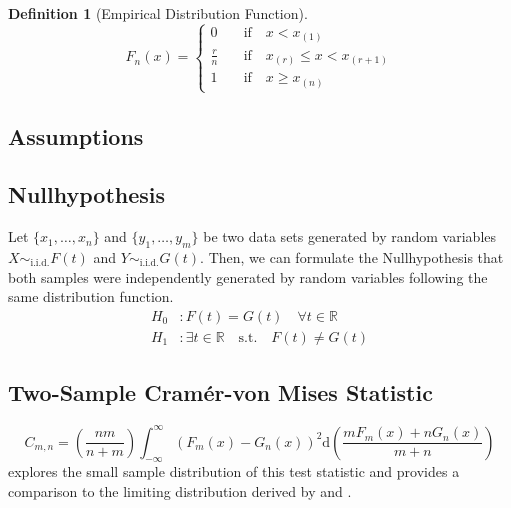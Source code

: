 \documentclass[12pt, a4paper]{article}
\theoremstyle{MAstyle} \newtheorem{assumption}{Assumption}[section]
\theoremstyle{MAstyle} \newtheorem{definition}{Definition}[section]
\begin{document}
			\begin{definition}[Empirical Distribution Function]
				\begin{equation}
					F_{n}(x) = \begin{cases}
						0 & \quad \text{if} \quad  x < x_{(1)} \\
						\frac{r}{n} & \quad \text{if} \quad  x_{(r)} \leq x < x_{(r + 1)} \\
						1 & \quad \text{if} \quad  x \geq x_{(n)}
					\end{cases}
				\end{equation}
			\end{definition}
		
		\subsection{Assumptions}
		
		\subsection{Nullhypothesis}
			Let $\{x_1, \dots , x_n\}$ and $\{y_1, \dots , y_m\}$ be two data sets generated by random variables $X \sim_{\text{i.i.d.}} F(t)$ and $Y \sim_{\text{i.i.d.}} G(t)$.
			Then, we can formulate the Nullhypothesis that both samples were independently generated by random variables following the same distribution function.
			\begin{equation}
				\begin{split}
					H_0&: F(t) = G(t) \quad \forall t \in \mathbb{R}\\
					H_1&: \exists t \in \mathbb{R} \quad \text{s.t.} \quad F(t) \neq G(t)
				\end{split}
			\end{equation}
			
		\subsection{Two-Sample Cram\'{e}r-von Mises Statistic}
			
			\cite{buning_nichtparametrische_2013}
			\begin{equation}
				C_{m,n} = \left(\frac{nm}{n+m}\right) \int_{-\infty}^{\infty}\left(F_{m}(x) - G_{n}(x)\right)^{2} \mathrm{d} \left(\frac{m F_{m}(x) + n G_{n}(x)}{m+n}\right)
			\end{equation}
			\cite{anderson_distribution_1962} explores the small sample distribution of this test statistic and provides a comparison to the limiting distribution derived by \cite{rosenblatt_limit_1952} and \cite{fisz_result_1960}.
		
\end{document}
